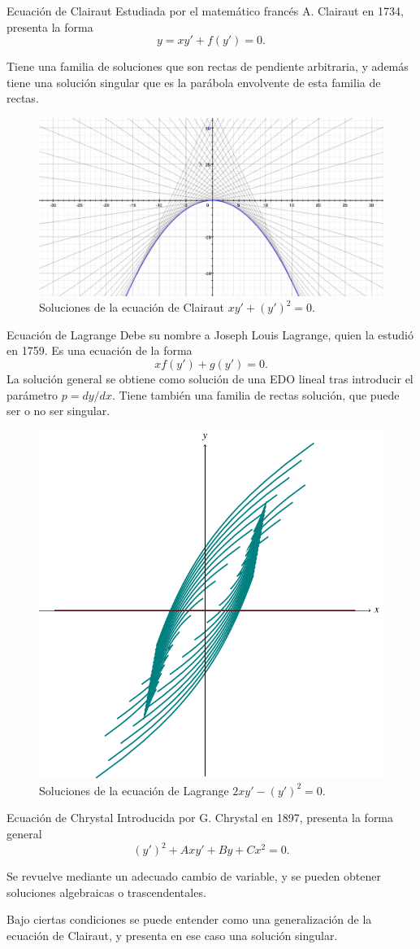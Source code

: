 \documentclass[10pt, spanish]{beamer}
\begin{document}
\begin{frame}{Ecuación de Clairaut}
  Estudiada por el matemático francés A. Clairaut en 1734, presenta la forma
  \[
  y=xy'+f(y')=0.
  \]

  Tiene una familia de soluciones que son rectas de pendiente arbitraria, y además tiene una solución singular que es la parábola envolvente de esta familia de rectas.

  \begin{figure}
	\centering
	\includegraphics[width=.6\textwidth]{../figures/clairaut1}
	\caption{\footnotesize Soluciones de la ecuación de Clairaut $xy'+(y')^2=0.$}
  \end{figure}
\end{frame}

\begin{frame}{Ecuación de Lagrange}
  Debe su nombre a Joseph Louis Lagrange, quien la estudió en 1759. Es una ecuación de la forma
  \[
    xf(y')+g(y')=0.
  \]
  La solución general se obtiene como solución de una EDO lineal tras introducir el parámetro $p=dy/dx$. Tiene también una familia de rectas solución, que puede ser o no ser singular.

  \begin{figure}
	\centering
	\includegraphics[width=.335\textwidth]{../figures/lagrange}
	\caption{\footnotesize Soluciones de la ecuación de Lagrange $2xy'-(y')^2=0.$}
  \end{figure}
\end{frame}

\begin{frame}{Ecuación de Chrystal}
  Introducida por G. Chrystal en 1897, presenta la forma general
  \[
(y')^2 + Axy' + By + Cx^2=0.
  \]

  Se revuelve mediante un adecuado cambio de variable, y se pueden obtener soluciones algebraicas o trascendentales.

  Bajo ciertas condiciones se puede entender como una generalización de la ecuación de Clairaut, y presenta en ese caso una solución singular.
\end{frame}
\end{document}
